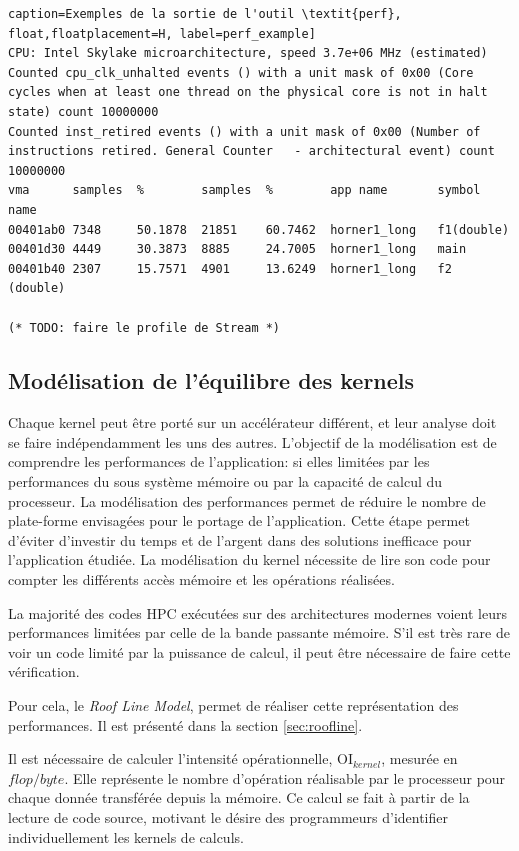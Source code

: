 \begin{lstlisting}[]caption=Exemples de la sortie de l'outil \textit{perf}, float,floatplacement=H, label=perf_example]
CPU: Intel Skylake microarchitecture, speed 3.7e+06 MHz (estimated)
Counted cpu_clk_unhalted events () with a unit mask of 0x00 (Core cycles when at least one thread on the physical core is not in halt state) count 10000000
Counted inst_retired events () with a unit mask of 0x00 (Number of instructions retired. General Counter   - architectural event) count 10000000
vma      samples  %        samples  %        app name       symbol name
00401ab0 7348     50.1878  21851    60.7462  horner1_long   f1(double)
00401d30 4449     30.3873  8885     24.7005  horner1_long   main
00401b40 2307     15.7571  4901     13.6249  horner1_long   f2 (double)

(* TODO: faire le profile de Stream *)
\end{lstlisting}



\subsection{Modélisation de l'équilibre des kernels}

Chaque kernel peut être porté sur un accélérateur différent, et leur analyse doit se faire indépendamment les uns des autres. L'objectif de la modélisation est de comprendre les performances de l'application: si elles limitées par les performances du sous système mémoire ou par la capacité de calcul du processeur. La modélisation des performances permet de réduire le nombre de plate-forme envisagées pour le portage de l'application. Cette étape permet d'éviter d'investir du temps et de l'argent dans des solutions inefficace pour l'application étudiée. La modélisation du kernel nécessite de lire son code pour compter les différents accès mémoire et les opérations réalisées.

La majorité des codes HPC exécutées sur des architectures modernes voient leurs performances limitées par celle de la bande passante mémoire. S'il est très rare de voir un code limité par la puissance de calcul, il peut être nécessaire de faire cette vérification. 

Pour cela, le \textit{Roof Line Model}, permet de réaliser cette représentation des performances. Il est présenté dans la section \ref{sec:roofline}. 

Il est nécessaire de calculer l'intensité opérationnelle, $\text{OI}_{kernel}$, mesurée en $flop/byte$. Elle représente le nombre d'opération réalisable par le processeur pour chaque donnée transférée depuis la mémoire. Ce calcul se fait à partir de la lecture de code source, motivant le désire des programmeurs d'identifier individuellement les kernels de calculs. 


